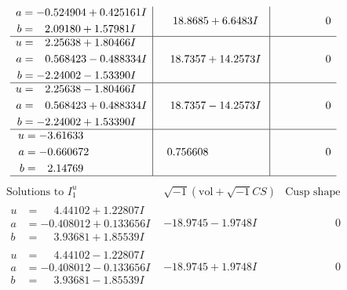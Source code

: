 \documentclass[1p]{elsarticle_modified}
\theoremstyle{definition}
\newcommand{\I}{\sqrt{-1}}
\begin{document}
$$\begin{array}{c|c|c}
\begin{aligned}
a &= -0.524904 + 0.425161 I \\
b &= \phantom{-}2.09180 + 1.57981 I\end{aligned}
 & \phantom{-}18.8685 + 6.6483 I & \phantom{-0.000000 } 0 \\ \hline\begin{aligned}
u &= \phantom{-}2.25638 + 1.80466 I \\
a &= \phantom{-}0.568423 - 0.488334 I \\
b &= -2.24002 - 1.53390 I\end{aligned}
 & \phantom{-}18.7357 + 14.2573 I & \phantom{-0.000000 } 0 \\ \hline\begin{aligned}
u &= \phantom{-}2.25638 - 1.80466 I \\
a &= \phantom{-}0.568423 + 0.488334 I \\
b &= -2.24002 + 1.53390 I\end{aligned}
 & \phantom{-}18.7357 - 14.2573 I & \phantom{-0.000000 } 0 \\ \hline\begin{aligned}
u &= -3.61633\phantom{ +0.000000I} \\
a &= -0.660672\phantom{ +0.000000I} \\
b &= \phantom{-}2.14769\phantom{ +0.000000I}\end{aligned}
 & \phantom{-}0.756608\phantom{ +0.000000I} & \phantom{-0.000000 } 0\\
 \hline 
 \end{array}$$\newpage$$\begin{array}{c|c|c}  
\text{Solutions to }I^u_{1}& \I (\text{vol} + \sqrt{-1}CS) & \text{Cusp shape}\\
 \hline 
\begin{aligned}
u &= \phantom{-}4.44102 + 1.22807 I \\
a &= -0.408012 + 0.133656 I \\
b &= \phantom{-}3.93681 + 1.85539 I\end{aligned}
 & -18.9745 - 1.9748 I & \phantom{-0.000000 } 0 \\ \hline\begin{aligned}
u &= \phantom{-}4.44102 - 1.22807 I \\
a &= -0.408012 - 0.133656 I \\
b &= \phantom{-}3.93681 - 1.85539 I\end{aligned}
 & -18.9745 + 1.9748 I & \phantom{-0.000000 } 0 \\ \hline\begin{aligned}

\end{aligned}
\end{array}$$
\end{document}
